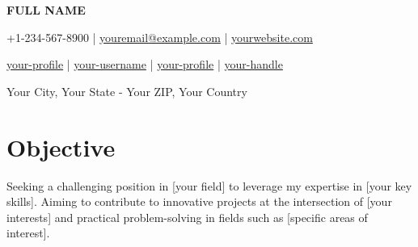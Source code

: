 \documentclass[a4paper,11pt]{article}
\newcommand{\socialicon}[1]{\raisebox{-0.05em}{\resizebox{!}{1em}{#1}}}
\newcommand{\headerfontiii}{\fontfamily{ppl}\selectfont} %
\begin{document}
\headerfontiii

\begin{center}
    {\Huge\textbf{FULL NAME}}
\end{center}
\vspace{-6mm}

\begin{center}
    \small{
    +1-234-567-8900 | \href{mailto:youremail@example.com}{youremail@example.com} |
    \href{https://www.yourwebsite.com/}{yourwebsite.com}
    }
\end{center}
\vspace{-6mm}

\begin{center}
    \small{
    \socialicon{\faLinkedin} \href{https://www.linkedin.com/in/your-profile/}{your-profile} |
    \socialicon{\faGithub} \href{https://github.com/your-username}{your-username} |
    \href{https://ieee-collabratec.ieee.org/app/p/your-profile}{your-profile} |
    \socialicon{\faTwitter} \href{https://twitter.com/your-handle}{your-handle}
    }
\end{center}
\vspace{-6mm}
\begin{center}
    \small{Your City, Your State - Your ZIP, Your Country}
\end{center}

\vspace{-4mm}

\section{\textbf{Objective}}
\vspace{1mm}
\small{
Seeking a challenging position in [your field] to leverage my expertise in [your key skills]. Aiming to contribute to innovative projects at the intersection of [your interests] and practical problem-solving in fields such as [specific areas of interest].
}
\vspace{-2mm}
\end{document}
